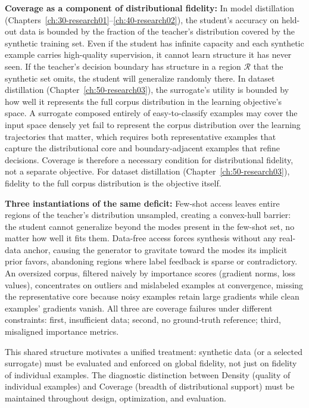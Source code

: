 \begin{foldable}
  \textbf{Coverage as a component of distributional fidelity:}
  In model distillation (Chapters~\ref{ch:30-research01}--\ref{ch:40-research02}), the student's accuracy on held-out data is bounded by the fraction of the teacher's distribution covered by the synthetic training set.
  Even if the student has infinite capacity and each synthetic example carries high-quality supervision, it cannot learn structure it has never seen.
  If the teacher's decision boundary has structure in a region $\mathcal{R}$ that the synthetic set omits, the student will generalize randomly there.
  In dataset distillation (Chapter~\ref{ch:50-research03}), the surrogate's utility is bounded by how well it represents the full corpus distribution in the learning objective's space.
  A surrogate composed entirely of easy-to-classify examples may cover the input space densely yet fail to represent the corpus distribution over the learning trajectories that matter, which requires both representative examples that capture the distributional core and boundary-adjacent examples that refine decisions.
  Coverage is therefore a necessary condition for distributional fidelity, not a separate objective. For dataset distillation (Chapter~\ref{ch:50-research03}), fidelity to the full corpus distribution is the objective itself.
\end{foldable}

\begin{foldable}
  \textbf{Three instantiations of the same deficit:}
  Few-shot access leaves entire regions of the teacher's distribution unsampled, creating a convex-hull barrier: the student cannot generalize beyond the modes present in the few-shot set, no matter how well it fits them.
  Data-free access forces synthesis without any real-data anchor, causing the generator to gravitate toward the modes its implicit prior favors, abandoning regions where label feedback is sparse or contradictory.
  An oversized corpus, filtered naively by importance scores (gradient norms, loss values), concentrates on outliers and mislabeled examples at convergence, missing the representative core because noisy examples retain large gradients while clean examples' gradients vanish.
  All three are coverage failures under different constraints: first, insufficient data; second, no ground-truth reference; third, misaligned importance metrics.
\end{foldable}

\begin{foldable}
  This shared structure motivates a unified treatment: synthetic data (or a selected surrogate) must be evaluated and enforced on global fidelity, not just on fidelity of individual examples.
  The diagnostic distinction between Density (quality of individual examples) and Coverage (breadth of distributional support) must be maintained throughout design, optimization, and evaluation.
\end{foldable}

